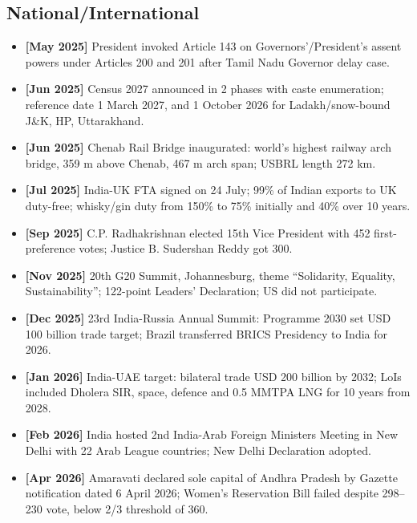 \documentclass[10pt,a4paper]{article}
\newcommand{\monthtag}[1]{\textbf{[#1]}}
\newcommand{\fact}[2]{\item \monthtag{#1} #2}
\begin{document}
\subsection{National/International}
\begin{itemize}
    \fact{May 2025}{President invoked Article 143 on Governors'/President's assent powers under Articles 200 and 201 after Tamil Nadu Governor delay case.}
    \fact{Jun 2025}{Census 2027 announced in 2 phases with caste enumeration; reference date 1 March 2027, and 1 October 2026 for Ladakh/snow-bound J\&K, HP, Uttarakhand.}
    \fact{Jun 2025}{Chenab Rail Bridge inaugurated: world's highest railway arch bridge, 359 m above Chenab, 467 m arch span; USBRL length 272 km.}
    \fact{Jul 2025}{India-UK FTA signed on 24 July; 99\% of Indian exports to UK duty-free; whisky/gin duty from 150\% to 75\% initially and 40\% over 10 years.}
    \fact{Sep 2025}{C.P. Radhakrishnan elected 15th Vice President with 452 first-preference votes; Justice B. Sudershan Reddy got 300.}
    \fact{Nov 2025}{20th G20 Summit, Johannesburg, theme ``Solidarity, Equality, Sustainability''; 122-point Leaders' Declaration; US did not participate.}
    \fact{Dec 2025}{23rd India-Russia Annual Summit: Programme 2030 set USD 100 billion trade target; Brazil transferred BRICS Presidency to India for 2026.}
    \fact{Jan 2026}{India-UAE target: bilateral trade USD 200 billion by 2032; LoIs included Dholera SIR, space, defence and 0.5 MMTPA LNG for 10 years from 2028.}
    \fact{Feb 2026}{India hosted 2nd India-Arab Foreign Ministers Meeting in New Delhi with 22 Arab League countries; New Delhi Declaration adopted.}
    \fact{Apr 2026}{Amaravati declared sole capital of Andhra Pradesh by Gazette notification dated 6 April 2026; Women's Reservation Bill failed despite 298--230 vote, below 2/3 threshold of 360.}
\end{itemize}
\end{document}
